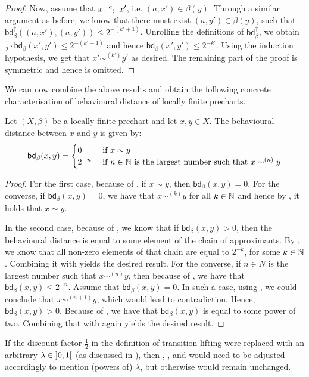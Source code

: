 \begin{proof}
		Now, assume that $x \tr{a} x'$, i.e. $(a,x') \in \beta(y)$. Through a similar argument as before, we know that there must exist $(a,y')\in \beta(y)$, such that $\mathsf{bd}_\beta^\uparrow((a,x'),(a,y')) \leq 2^{-(k'+1)}$. Unrolling the definitions of $\mathsf{bd}_\beta^\uparrow$, we obtain $\frac{1}{2} \cdot \mathsf{bd}_{\beta}(x',y') \leq 2^{-(k'+1)}$ and hence $\mathsf{bd}_{\beta}(x',y') \leq 2^{-k'}$. Using the induction hypothesis, we get that $x' \sim^{(k')} y'$ as desired. The remaining part of the proof is symmetric and hence is omitted.
\end{proof}
We can now combine the above results and obtain the following concrete characterisation of behavioural distance of locally finite precharts.
\begin{theorem}\label{thm:concrete_distance}
Let $(X,\beta)$ be a locally finite prechart and let $x,y \in X$. The behavioural distance between $x$ and $y$ is given by:
	$$\mathsf{bd}_\beta(x,y) = \begin{cases}
		0 & \text{ if } x \sim y\\
		2^{-n} & \text{ if } n \in \mathbb{N} \text{ is the largest number such that } x\sim^{(n)} y
	\end{cases}$$
\end{theorem}
\begin{proof}
	For the first case, because of , if $x \sim y$, then $\mathsf{bd}_{\beta}(x,y)=0$. For the converse, if $\mathsf{bd}_{\beta}(x,y)=0$, we have that $x \sim^{(k)} y$ for all $k \in \mathbb{N}$ and hence by , it holds that $x \sim y$.
	
	 In the second case, because of , we know that if $\mathsf{bd}_\beta(x,y) > 0$, then the behavioural distance is equal to some element of the chain of approximants. By , we know that all non-zero elements of that chain are equal to $2^{-k}$, for some $k \in \mathbb{N}$. Combining it with  yields the desired result. 
	 For the converse, if $n \in N$ is the largest number such that $x \sim^{(n)} y$, then because of , we have that $\mathsf{bd}_\beta(x,y)\leq 2^{-n}$. Assume that $\mathsf{bd}_\beta(x,y)=0$. In such a case, using , we could conclude that $x \sim^{(n+1)} y$, which would lead to contradiction. Hence, $\mathsf{bd}_\beta(x,y)>0$. Because of , we have that $\mathsf{bd}_\beta(x,y)$ is equal to some power of two. Combining that with  again yields the desired result.\qedhere
\end{proof}
\begin{remark}
If the discount factor $\frac{1}{2}$ in the definition of transition lifting were replaced with an arbitrary $\lambda \in \interval[open]{0}{1}$ (as discussed in ), then , ,  and  would need to be adjusted accordingly to mention (powers of) $\lambda$, but otherwise would remain unchanged.
\end{remark}
